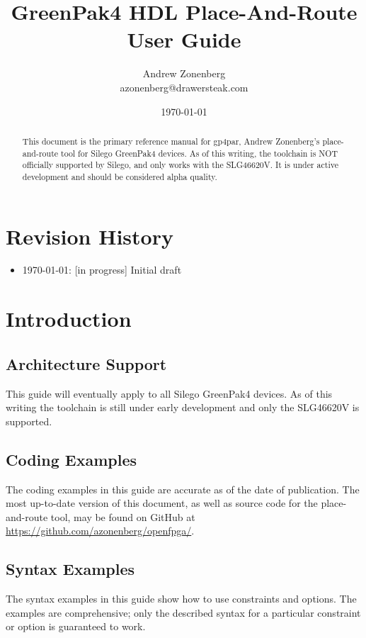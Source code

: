 \documentclass[11pt]{article}
\begin{document}
\title{GreenPak4 HDL Place-And-Route User Guide}
\author{Andrew Zonenberg\\
azonenberg@drawersteak.com}
\date{\today}
\maketitle

\begin{abstract}
This document is the primary reference manual for gp4par, Andrew Zonenberg's place-and-route tool for Silego 
GreenPak4 devices. As of this writing, the toolchain is NOT officially supported by Silego, and only works with the 
SLG46620V. It is under active development and should be considered alpha quality.
\end{abstract}

\pagebreak

\tableofcontents

\pagebreak
\section{Revision History}
\begin{itemize}
\item \today: [in progress] Initial draft
\end{itemize}

\pagebreak
\section{Introduction}

\subsection{Architecture Support}
This guide will eventually apply to all Silego GreenPak4 devices. As of this writing the toolchain is still under early
development and only the SLG46620V is supported.

\subsection{Coding Examples}
The coding examples in this guide are accurate as of the date of publication. The most up-to-date version of this 
document, as well as source code for the place-and-route tool, may be found on GitHub at 
\url{https://github.com/azonenberg/openfpga/}.

\subsection{Syntax Examples}
The syntax examples in this guide show how to use constraints and options. The examples are comprehensive; only the 
described syntax for a particular constraint or option is guaranteed to work.
\end{document}
